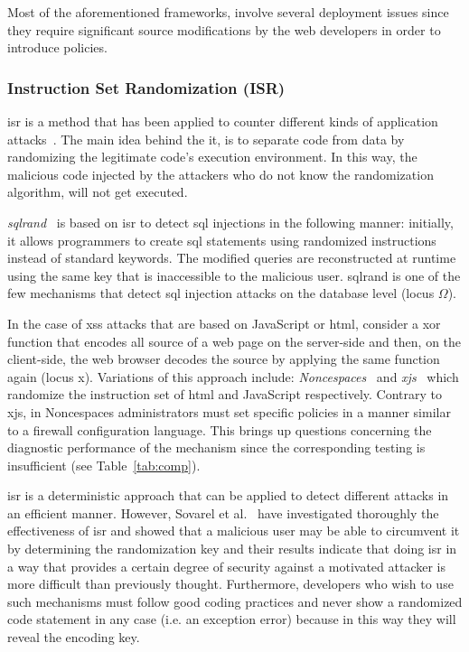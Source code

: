 \documentclass[conference]{IEEEtran}
\begin{document}
Most of the aforementioned frameworks, involve
several deployment issues since they
require significant source modifications by the web
developers in order to introduce policies.

\subsubsection{Instruction Set Randomization (ISR)}

{\sc isr} is a method that has been applied to counter
different kinds of application attacks~\cite{K09b,KKP03}.
The main idea behind the it, is to
separate code from data by randomizing the legitimate code's 
execution environment. In this way, the malicious code
injected by the attackers who do not know the randomization
algorithm, will not get executed.

{\it {\sc sql}rand}~\cite{BK04} is based on {\sc isr}
to detect {\sc sql} injections in the following manner:
initially, it allows programmers to create {\sc sql} statements
using randomized instructions instead of standard keywords.
The modified queries are reconstructed at runtime using
the same key that is inaccessible to the malicious user.
{\sc sql}rand is one of the few mechanisms that
detect {\sc sql} injection attacks on the database
level (locus $\Omega$).

In the case of {\sc xss} attacks that are based on JavaScript
or {\sc html}, consider a {\sc xor} function that encodes all source of a web
page on the server-side and then, on the client-side, the web browser decodes the
source by applying the same function again (locus {\sc x}).
Variations of this approach include:
{\it Noncespaces}~\cite{GC09} and {\it x{\sc js}}~\cite{APKLM10}
which randomize the instruction set of {\sc html} and
JavaScript respectively.
Contrary to x{\sc js}, in Noncespaces administrators must set
specific policies in a manner similar to a firewall
configuration language. This brings up questions
concerning the diagnostic performance of the mechanism
since the corresponding testing is insufficient
(see Table~\ref{tab:comp}).

{\sc isr} is a deterministic approach that can be applied
to detect different attacks in an efficient manner.
However, Sovarel et al.~\cite{SEP05}
have investigated thoroughly the effectiveness
of {\sc isr} and showed that a malicious user
may be able to circumvent it by determining
the randomization key and their results
indicate that doing {\sc isr} in a way that
provides a certain degree of security against a motivated
attacker is more difficult than previously thought.
Furthermore, developers who wish to use
such mechanisms must follow good coding practices
and never show a randomized code statement in any case
(i.e. an exception error) because in this way
they will reveal the encoding key.
\end{document}
